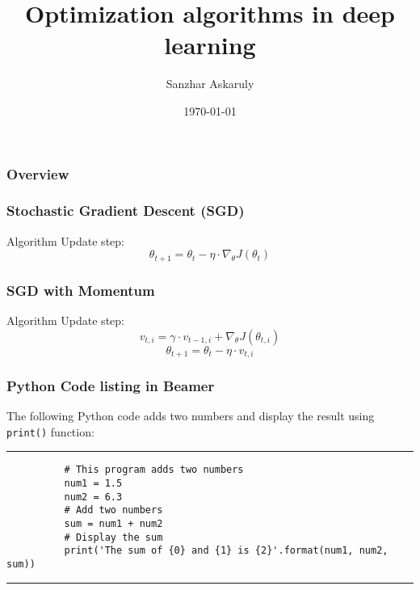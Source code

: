 \documentclass{beamer}
\title[CodeSeoul] %
	{Optimization algorithms in deep learning}
\author[AI Research Paper Review] %
	{Sanzhar Askaruly}
\institute[] %
	{ Ulsan National Institute of Science and Technology\newline
	  Ph.D. Candidate in Biomedical Engineering}
\date{\today}
\begin{document}

    \begin{frame}
    \frametitle{Overview} %
    \tableofcontents 
    \end{frame}

    \begin{frame}
      \frametitle{Stochastic Gradient Descent (SGD)} %
      \begin{block}{Algorithm}
        Update step:
        \begin{equation}    %
          \theta_{t+1} = \theta_{t} - \eta \cdot \nabla_{\theta}J(\theta_t)
        \end{equation}
      \end{block}
    \end{frame}

    \begin{frame}
      \frametitle{SGD with Momentum} %
      \begin{block}{Algorithm}
        Update step:
        \begin{equation}    %
          v_{t,i} = \gamma \cdot v_{t-1,i} + \nabla_{\theta}J(\theta_{t,i})
        \end{equation}
        \begin{equation}    %
          \theta_{t+1} = \theta_{t} - \eta \cdot v_{t,i}
        \end{equation}
      \end{block}
    \end{frame}

    \begin{frame}[fragile]
      \frametitle{Python Code listing in Beamer}
      The following Python code adds two numbers and display the result using \verb|print()| function:
      \rule{\textwidth}{1pt}
      \scriptsize
      \begin{verbatim}
          # This program adds two numbers
          num1 = 1.5
          num2 = 6.3
          # Add two numbers
          sum = num1 + num2
          # Display the sum
          print('The sum of {0} and {1} is {2}'.format(num1, num2, sum))
      \end{verbatim}
      \rule{\textwidth}{1pt}
    \end{frame}
\end{document}
